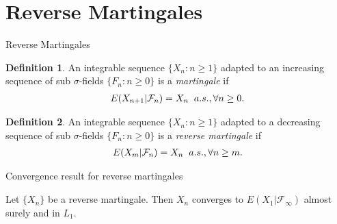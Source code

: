 \documentclass{beamer}
\theoremstyle{definition}
\newtheorem{Def}{Definition}
\numberwithin{Def}{section}
\begin{document}
\section{Reverse Martingales}
\begin{frame}{Reverse Martingales}
\begin{Def}
An integrable sequence $\{X_n: n\ge 1\}$ adapted to an increasing sequence of sub $\sigma$-fields $\{F_n: n\ge 0\}$ is a \textit{martingale} if
\begin{align*}
 E(X_{n+1}|\mathcal{F}_n)=X_n \hspace{0.2cm} a.s., \forall n\ge0.
\end{align*}
\end{Def}
\begin{Def}
An integrable sequence $\{X_n: n\ge 1\}$ adapted to a decreasing sequence of sub $\sigma$-fields $\{F_n: n\ge 0\}$ is a \textit{reverse martingale} if
\begin{align*}
 E(X_m|\mathcal{F}_n)=X_n \hspace{0.2cm} a.s., \forall n\ge m.
\end{align*}
\end{Def}
\end{frame}
\begin{frame}{Convergence result for reverse martingales}
\begin{theorem}\label{conv_rm}
Let $\{X_n\}$ be a reverse martingale. Then $X_n$ converges to $E(X_1|\mathcal{F}_{\infty})$ almost surely and in $L_1$. 
\end{theorem}
\end{frame}
\end{document}
